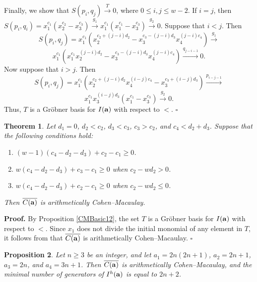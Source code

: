 \documentclass[10pt,a4paper]{amsart}
\newtheorem{thm1}{Theorem}[section]
\newtheorem{prop1}[thm1]{Proposition}
\begin{document}
Finally, we show that $S(p_{i},q_{j}) \stackrel{T}{\longrightarrow} 0$, where $0 \leq i, j \leq w-2$. If $i=j$, then 
$S(p_i,q_i)=x_1^{c_1}(x_2^{c_2}-x_3^{c_3}) \stackrel{g_1} {\longrightarrow} x_1^{c_1}(x_1^{c_1}-x_3^{c_3}) \stackrel{g_2} {\longrightarrow} 0$. Suppose that $i<j$. Then $$S(p_{i},q_{j})=x_{1}^{c_1}(x_{2}^{c_2+(j-i)d_2}-x_{3}^{c_3-(j-i)d_3}x_{4}^{(j-i)c_4}) \stackrel{g_{1}}{\longrightarrow}$$ $$x_{1}^{c_1}(x_{1}^{c_1}x_{2}^{(j-i)d_2}-x_{3}^{c_3-(j-i)d_3}x_{4}^{(j-i)c_4}) \stackrel{q_{j-i-1}}{\longrightarrow} 0.$$ Now suppose that $i>j$. Then $$S(p_{i},q_{j})=x_{1}^{c_1}(x_{2}^{c_2+(j-i)d_2}x_{4}^{(i-j)c_4}-x_{3}^{c_3+(i-j)d_3}) \stackrel{p_{i-j-1}}{\longrightarrow}$$ $$x_{1}^{c_1}x_{3}^{(i-j)d_3}(x_{1}^{c_1}-x_{3}^{c_3}) \stackrel{g_{2}}{\longrightarrow} 0.$$ Thus, $T$ is a Gr\"obner basis for $I({\bf a})$ with respect to $<$. \hfill $\square$ \par\vspace{0.5\baselineskip}


\begin{thm1} \label{CM16} Let $d_1=0$, $d_{2}<c_{2}$, $d_{3}<c_{3}$, $c_3>c_2$, and $c_4<d_{2}+d_{3}$. Suppose that the following conditions hold:
\begin{enumerate} \item $(w-1)(c_{4}-d_{2}-d_{3})+c_{2}-c_{1} \geq 0$.
\item $w(c_{4}-d_{2}-d_{3})+c_{3}-c_{1} \geq 0$ when $c_{2}-wd_{2}> 0$.
\item $w(c_{4}-d_{2}-d_{3})+c_{2}-c_{1} \geq 0$ when $c_{2}-wd_{2} \leq 0$.

\end{enumerate}
Then $\overline{C({\bf a})}$ is arithmetically Cohen--Macaulay.
\end{thm1}


\noindent \textbf{Proof.} By Proposition \ref{CMBasic12}, the set $T$ is a Gr\"obner basis for $I({\bf a})$ with respect to $<$. Since $x_1$ does not divide the initial monomial of any element in $T$, it follows from \cite[Theorem 2.2]{HerSta} that $\overline{C({\bf a})}$ is arithmetically Cohen--Macaulay. \hfill $\square$



\begin{prop1} \label{ACM7} Let $n \geq 3$ be an integer, and let
$a_1=2n(2n+1)$, $a_2=2n+1$, $a_3=2n$, and $a_4=3n+1$. Then
$\overline{C({\bf a})}$ is arithmetically Cohen--Macaulay, and the minimal
number of generators of $I^{h}({\bf a})$ is equal to $2n+2$.
\end{prop1}
\end{document}
